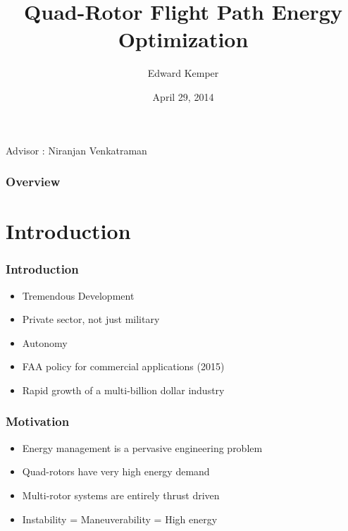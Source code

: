 \documentclass{beamer}
\title[Path-Energy Optimization]{Quad-Rotor Flight Path Energy Optimization}
\author{Edward Kemper} %
\institute[Northern Arizona University]
{
Northern Arizona University \\ %
\medskip
\textit{edwardkemper@gmail.com} %
\medskip
}
\date{April 29, 2014}
\begin{document}
\begin{frame}
\titlepage %
\begin{center}Advisor : Niranjan Venkatraman\end{center}

\end{frame}



\begin{frame}
\frametitle{Overview}
\tableofcontents
\end{frame}


\section{Introduction}

\begin{frame}
\frametitle{Introduction}
\begin{itemize}
\item Tremendous Development
\item Private sector, not just military
\item Autonomy
\item FAA policy for commercial applications (2015)
\item Rapid growth of a multi-billion dollar industry
\end{itemize}
\end{frame}



\begin{frame}
\frametitle{Motivation}
\begin{itemize}
\item Energy management is a pervasive engineering problem
\item Quad-rotors have very high energy demand
\item Multi-rotor systems are entirely thrust driven
\item Instability = Maneuverability = High energy

\end{itemize}
\end{frame}
\end{document}
